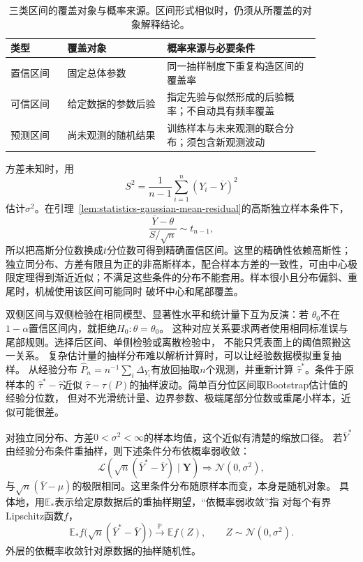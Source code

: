 \begin{table}[htbp]
  \centering
  \begin{tabular}{p{0.16\linewidth}p{0.29\linewidth}p{0.43\linewidth}}
    \toprule
    类型 & 覆盖对象 & 概率来源与必要条件\\
    \midrule
    置信区间 & 固定总体参数 & 同一抽样制度下重复构造区间的覆盖率\\
    可信区间 & 给定数据的参数后验 & 指定先验与似然形成的后验概率；不自动具有频率覆盖\\
    预测区间 & 尚未观测的随机结果 & 训练样本与未来观测的联合分布；须包含新观测波动\\
    \bottomrule
  \end{tabular}
  \caption{三类区间的覆盖对象与概率来源。区间形式相似时，仍须从所覆盖的对象解释结论。}
  \label{tab:statistics-interval-objects}
\end{table}

方差未知时，用
\[
  S^2=\frac1{n-1}\sum_{i=1}^n(Y_i-\overline Y)^2
\]
估计\(\sigma^2\)。在引理~\ref{lem:statistics-gaussian-mean-residual}的高斯独立样本条件下，
\[
  \frac{\overline Y-\theta}{S/\sqrt n}\sim t_{n-1},
\]
所以把高斯分位数换成\(t\)分位数可得到精确置信区间。这里的精确性依赖高斯性；
独立同分布、方差有限且为正的非高斯样本，配合样本方差的一致性，可由中心极限定理得到渐近近似；不满足这些条件的分布不能套用。样本很小且分布偏斜、重尾时，机械使用该区间可能同时
破坏中心和尾部覆盖。

双侧区间与双侧检验在相同模型、显著性水平和统计量下互为反演：若
\(\theta_0\)不在\(1-\alpha\)置信区间内，就拒绝\(H_0:\theta=\theta_0\)。
这种对应关系要求两者使用相同标准误与尾部规则。选择后区间、单侧检验或离散检验中，
不能只凭表面上的阈值照搬这一关系。
复杂估计量的抽样分布难以解析计算时，可以让经验数据模拟重复抽样。
从经验分布
\(\widehat P_n=n^{-1}\sum_i\Delta_{Y_i}\)有放回抽取\(n\)个观测，并重新计算
\(\widehat\tau^\ast\)。条件于原样本的
\(\widehat\tau^\ast-\widehat\tau\)近似
\(\widehat\tau-\tau(P)\)的抽样波动。简单百分位区间取Bootstrap估计值的经验分位数，
但对不光滑统计量、边界参数、极端尾部分位数或重尾小样本，近似可能很差。

对独立同分布、方差\(0<\sigma^2<\infty\)的样本均值，这个近似有清楚的缩放口径。
若\(\overline Y^\ast\)由经验分布条件重抽样，则下述条件分布依概率弱收敛：
\[
  \mathcal L\!\left(
    \sqrt n(\overline Y^\ast-\overline Y)\mid\bm Y
  \right)
  \Longrightarrow\mathcal N(0,\sigma^2),
\]
与\(\sqrt n(\overline Y-\mu)\)的极限相同。这里条件分布随原样本而变，本身是随机对象。
具体地，用\(\mathbb E_\ast\)表示给定原数据后的重抽样期望，“依概率弱收敛”指
对每个有界Lipschitz函数\(f\)，
\[
 \mathbb E_\ast f\bigl(\sqrt n(\overline Y^\ast-\overline Y)\bigr)
 \xrightarrow{\mathbb P}\mathbb E f(Z),\qquad Z\sim\mathcal N(0,\sigma^2).
\]
外层的依概率收敛针对原数据的抽样随机性。

